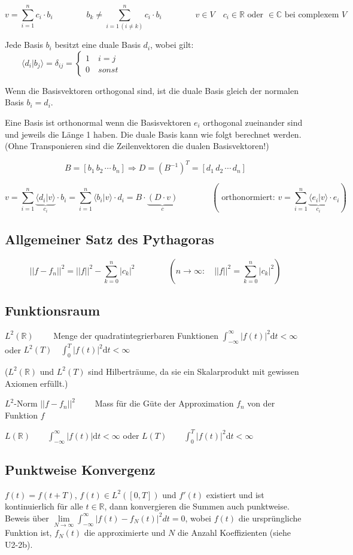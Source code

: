 \[  
	v = \sum_{i=1}^{n}c_i \cdot b_i \qquad \qquad  b_k \neq \sum_{i=1 \, (i\neq k)}^{n}c_i \cdot b_i \qquad \qquad v \in V \quad c_i \in \mathbb{R}\text{ oder } \in \mathbb{C} \text{ bei complexem $V$}
\]

Jede Basis $b_i$ besitzt eine duale Basis $d_i$, wobei gilt: $\qquad \langle d_i|b_j\rangle = \delta_{ij} = \begin{cases} 1 \quad i=j\\ 0 \quad sonst  \end{cases}$

Wenn die Basisvektoren orthogonal sind, ist die duale Basis gleich der normalen Basis $b_i = d_i$.

Eine Basis ist orthonormal wenn die Basisvektoren $e_i$ orthogonal zueinander sind und jeweils die Länge 1 haben. Die duale Basis kann wie folgt berechnet werden. (Ohne Transponieren sind die Zeilenvektoren die dualen Basisvektoren!)

\[  
	B = \left[ b_1 \, b_2 \, \cdots \, b_n \right] \Rightarrow D=(B^{-1})^T = \left[ d_1 \, d_2 \, \cdots \, d_n \right]
\]

\[
	v=\sum_{i=1}^{n} \underbrace{\langle d_i|v \rangle}_{c_i} \cdot b_i = \sum_{i=1}^{n} \langle b_i|v \rangle \cdot d_i = B \cdot \underbrace{(D \cdot v)}_{c}
	\qquad \qquad 
	\left( \text{ orthonormiert: } v=\sum_{i=1}^{n} \underbrace{\langle e_i|v \rangle}_{c_i} \cdot e_i \right) 
\]


\subsection{Allgemeiner Satz des Pythagoras}

\[  
	||f-f_n||^2 =  ||f||^2 - \sum_{k=0}^{n} |c_k|^2 \qquad \qquad \left( n\rightarrow \infty: \quad ||f||^2=\sum_{k=0}^{n} |c_k|^2 \right)
\]


\subsection{Funktionsraum}
$L^2(\mathbb{R}) \qquad$ Menge der quadratintegrierbaren Funktionen $\int_{-\infty}^{\infty}|f(t)|^2 \mathrm{d}t < \infty$ oder $L^2(T) \quad \int_{0}^{T}|f(t)|^2 \mathrm{d}t < \infty$

($L^2(\mathbb{R})$ und $L^2(T)$ sind Hilberträume, da sie ein Skalarprodukt mit gewissen Axiomen erfüllt.)

$L^2$-Norm $||f-f_n||^2 \qquad$ Mass für die Güte der Approximation $f_n$ von der Funktion $f$

$L(\mathbb{R}) \qquad \int_{-\infty}^{\infty}|f(t)| \mathrm{d}t < \infty$ oder $L(T) \qquad \int_{0}^{T}|f(t)|^2 \mathrm{d}t < \infty$

\subsection{Punktweise Konvergenz}
$f(t) = f(t+T)$, $f(t) \in L^2([0,T])$ und $f'(t)$ existiert und ist kontinuierlich für alle $t \in \mathbb{R}$, dann konvergieren die Summen auch punktweise. Beweis über $\lim\limits_{N \rightarrow \infty} \int_{-\infty}^{\infty} | f(t) - f_N(t) |^2 dt = 0$, wobei $f(t)$ die ursprüngliche Funktion ist, $f_N(t)$ die approximierte und $N$ die Anzahl Koeffizienten (siehe U2-2b).
